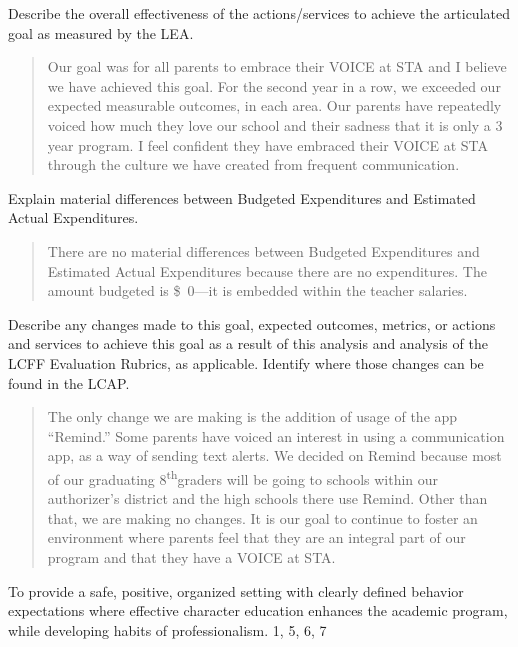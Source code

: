 \documentclass{article}
\newcommand{\supth}{\textsuperscript{th}}
\newcommand{\dollar}[1]{\SI{#1}[\$]{}}
\newcounter{goal}[section] %
\newcounter{action}[goal]
\begin{document}
Describe the overall effectiveness of the actions/services to achieve the articulated goal as measured by the LEA.
\begin{quotation}
	Our goal was for all parents to embrace their VOICE at STA and I believe we have achieved this goal. For the second year in a row, we exceeded our expected measurable outcomes, in each area. Our parents have repeatedly voiced how much they love our school and their sadness that it is only a 3 year program. I feel confident they have embraced their VOICE at STA through the culture we have created from frequent communication.
\end{quotation}

Explain material differences between Budgeted Expenditures and Estimated Actual Expenditures.
\begin{quotation}
	There are no material differences between Budgeted Expenditures and Estimated Actual Expenditures because there are no expenditures. The amount budgeted is \dollar{0}---it is embedded within the teacher salaries.
\end{quotation}

Describe any changes made to this goal, expected outcomes, metrics, or actions and services to achieve this goal as a result of this analysis and analysis of the LCFF Evaluation Rubrics, as applicable. Identify where those changes can be found in the LCAP.
\begin{quotation}
	The only change we are making is the addition of usage of the app ``Remind.'' Some parents have voiced an interest in using a communication app, as a way of sending text alerts. We decided on Remind because most of our graduating 8\supth graders will be going to schools within our authorizer's district and the high schools there use Remind. Other than that, we are making no changes. It is our goal to continue to foster an environment where parents feel that they are an integral part of our program and that they have a VOICE at STA.
\end{quotation}

\Goal
	{To provide a safe, positive, organized setting with clearly defined behavior expectations where effective character education enhances the academic program, while developing habits of professionalism.}
	{1, 5, 6, 7}
	{}
\end{document}
